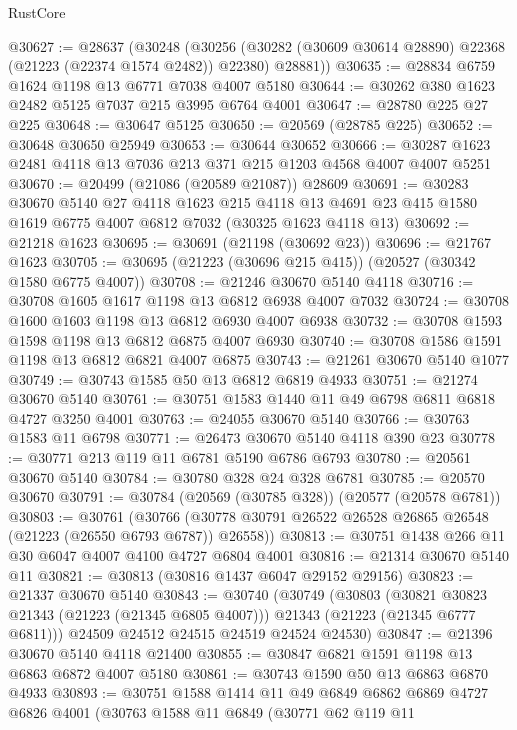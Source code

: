 \begin{lexlean}{RustCore}
\begin{coremodule}
@30627 := @28637
    (@30248
      (@30256 (@30282 (@30609 @30614 @28890) @22368 (@21223 (@22374 @1574 @2482)) @22380) @28881))
@30635 := @28834 @6759 @1624 @1198 @13 @6771 @7038 @4007 @5180
@30644 := @30262 @380 @1623 @2482 @5125 @7037 @215 @3995 @6764 @4001
@30647 := @28780 @225 @27 @225
@30648 := @30647 @5125
@30650 := @20569 (@28785 @225)
@30652 := @30648 @30650 @25949
@30653 := @30644 @30652
@30666 := @30287 @1623 @2481 @4118 @13 @7036 @213 @371 @215 @1203 @4568 @4007 @4007 @5251
@30670 := @20499 (@21086 (@20589 @21087)) @28609
@30691 := @30283
    @30670
    @5140
    @27
    @4118
    @1623
    @215
    @4118
    @13
    @4691
    @23
    @415
    @1580
    @1619
    @6775
    @4007
    @6812
    @7032
    (@30325 @1623 @4118 @13)
@30692 := @21218 @1623
@30695 := @30691 (@21198 (@30692 @23))
@30696 := @21767 @1623
@30705 := @30695 (@21223 (@30696 @215 @415)) (@20527 (@30342 @1580 @6775 @4007))
@30708 := @21246 @30670 @5140 @4118
@30716 := @30708 @1605 @1617 @1198 @13 @6812 @6938 @4007 @7032
@30724 := @30708 @1600 @1603 @1198 @13 @6812 @6930 @4007 @6938
@30732 := @30708 @1593 @1598 @1198 @13 @6812 @6875 @4007 @6930
@30740 := @30708 @1586 @1591 @1198 @13 @6812 @6821 @4007 @6875
@30743 := @21261 @30670 @5140 @1077
@30749 := @30743 @1585 @50 @13 @6812 @6819 @4933
@30751 := @21274 @30670 @5140
@30761 := @30751 @1583 @1440 @11 @49 @6798 @6811 @6818 @4727 @3250 @4001
@30763 := @24055 @30670 @5140
@30766 := @30763 @1583 @11 @6798
@30771 := @26473 @30670 @5140 @4118 @390 @23
@30778 := @30771 @213 @119 @11 @6781 @5190 @6786 @6793
@30780 := @20561 @30670 @5140
@30784 := @30780 @328 @24 @328 @6781
@30785 := @20570 @30670
@30791 := @30784 (@20569 (@30785 @328)) (@20577 (@20578 @6781))
@30803 := @30761
    (@30766 (@30778 @30791 @26522 @26528 @26865 @26548 (@21223 (@26550 @6793 @6787)) @26558))
@30813 := @30751 @1438 @266 @11 @30 @6047 @4007 @4100 @4727 @6804 @4001
@30816 := @21314 @30670 @5140 @11
@30821 := @30813 (@30816 @1437 @6047 @29152 @29156)
@30823 := @21337 @30670 @5140
@30843 := @30740
    (@30749
      (@30803
        (@30821 @30823 @21343 (@21223 (@21345 @6805 @4007)))
        @21343
        (@21223 (@21345 @6777 @6811)))
      @24509
      @24512
      @24515
      @24519
      @24524
      @24530)
@30847 := @21396 @30670 @5140 @4118 @21400
@30855 := @30847 @6821 @1591 @1198 @13 @6863 @6872 @4007 @5180
@30861 := @30743 @1590 @50 @13 @6863 @6870 @4933
@30893 := @30751
    @1588
    @1414
    @11
    @49
    @6849
    @6862
    @6869
    @4727
    @6826
    @4001
    (@30763
      @1588
      @11
      @6849
      (@30771
        @62
        @119
        @11

\end{coremodule}
\end{lexlean}
